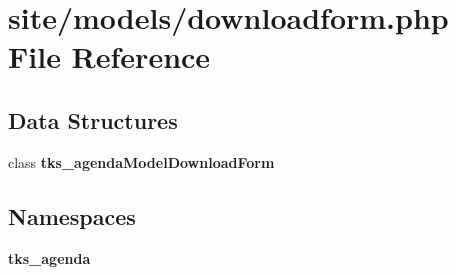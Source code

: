 \section{site/models/downloadform.php File Reference}
\label{models_2downloadform_8php}
\subsection*{Data Structures}
\begin{DoxyCompactItemize}
\item 
class \textbf{ tks\+\_\+agenda\+Model\+Download\+Form}
\end{DoxyCompactItemize}
\subsection*{Namespaces}
\begin{DoxyCompactItemize}
\item 
 \textbf{ tks\+\_\+agenda}
\end{DoxyCompactItemize}
